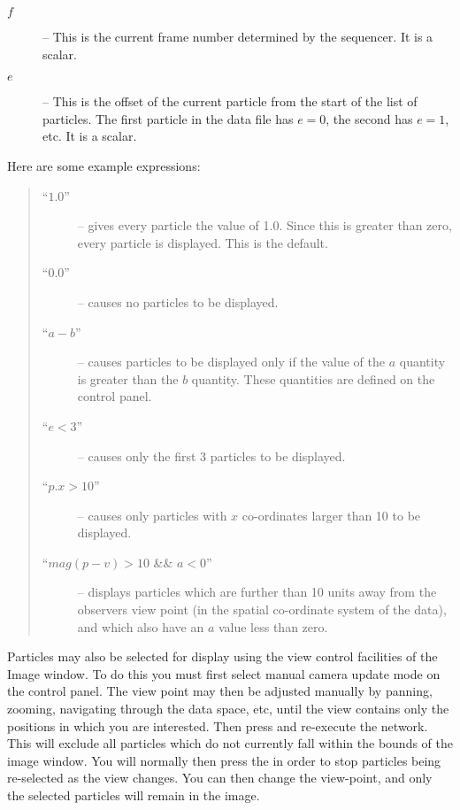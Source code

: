 \begin{description}
\begin{description}
\item[$f$ ] --
This is the current frame number determined by the sequencer. It is a scalar.

\item[$e$ ] --
This is the offset of the current particle from the start of the list of
particles. The first particle in the data file has $e=0$, the second has
$e=1$, etc. It is a scalar.

\end{description}

Here are some  example expressions:

\begin{quote}
\begin{description}

\item [``$1.0$''] -- gives every particle the value of 1.0.
Since this is greater than zero, every particle is displayed. This is the
default.

\item [``$0.0$'' ] -- causes no particles to be displayed.

\item [``$a-b$'' ] -- causes particles to be displayed only if the value of the $a$
quantity is greater than the $b$ quantity. These
quantities are defined on the  control panel.

\item [``$e<3$'' ] -- causes only the first 3 particles to be displayed.

\item [``$p.x>10$'' ] -- causes only particles with $x$ co-ordinates larger than 10 to be
displayed.

\item [``$mag(p-v)>10$ {\scriptsize \&\&} $a<0$'' ] -- displays particles which are further than 10 units
away from the observers view point (in the spatial co-ordinate system of
the data), and which also have an $a$ value less than zero.

\end{description}
\end{quote}

Particles may also be selected for display using the view control
facilities of the Image window. To do this you must first select manual
camera update mode on the  control panel. The
view point may then be adjusted manually by panning, zooming, navigating
through the data space, etc, until the view contains only the positions
in which you are interested. Then press  and re-execute the network. This will exclude all particles
which do not currently fall within the bounds of the image window. You
will normally then press the  in order
to stop particles being re-selected as the view changes. You can then
change the view-point, and only the selected particles will remain in the
image.


\end{description}
